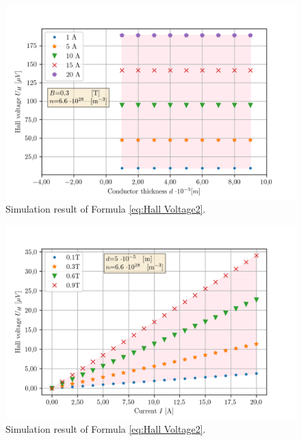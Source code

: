    \begin{figure}[!htbp]
    \begin{center}
    \includegraphics[scale=0.9]{figuren/simulatie/d.png} 
    \end{center}
    \caption{Simulation result of Formula \ref{eq:Hall Voltage2}.} \label{fig:sim_d}
    \end{figure}
    
    \begin{figure}[!htbp]
    \begin{center}
    \includegraphics[scale=0.9]{figuren/simulatie/I.png}
    \end{center}
    \caption{Simulation result of Formula \ref{eq:Hall Voltage2}.}  \label{fig:sim_I}
    \end{figure}

